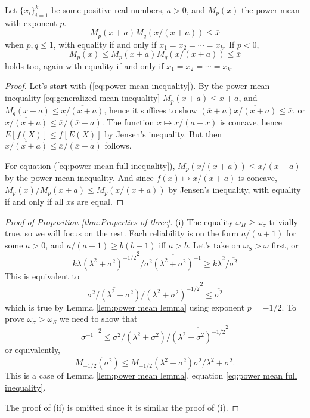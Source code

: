 \documentclass[twoside]{article}
\begin{document}
\begin{lem}
\label{lem:power mean lemma}Let $\{ x_{i}\} _{i=1}^{k}$
be some positive real numbers, $a>0$, and $M_{p}(x)$
the power mean with exponent $p$. 
\begin{equation}
M_{p}(x+a)M_{q}(x/{(x+a)})\leq\overline{x}\label{eq:power mean inequality}
\end{equation}
when $p,q\leq1$, with equality if and only if $x_{1}=x_{2}=\cdots=x_{k}$.
If $p<0$, 
\begin{equation}
M_{p}(x)\leq M_{p}(x+a)M_{q}(x/{(x+a)})\leq\overline{x}\label{eq:power mean full inequality}
\end{equation}
holds too, again with equality if and only if $x_{1}=x_{2}=\cdots=x_{k}$.
\end{lem}

\begin{proof}
Let's start with (\ref{eq:power mean inequality}). By the power
mean inequality \eqref{eq:generalized mean inequality}  $M_{p}(x+a)\leq\overline{x}+a$, and $M_{q}(x+a)\leq\overline{x/(x+a)}$,
hence it suffices to show $(\overline{x}+a)\overline{x/(x+a)}\leq\overline{x}$,
or $\overline{x/(x+a)}\leq\overline{x}/(\overline{x}+a)$.
The function $x\mapsto x/(a+x)$ is concave, hence $E[f(X)]\leq f[E(X)]$
by Jensen's inequality. But then $\overline{x/(x+a)}\leq\overline{x}/(\overline{x}+a)$
follows.

For equation (\ref{eq:power mean full inequality}), $M_{p}(x/({x+a}))\leq\overline{x}/(\overline{x}+a)$
by the power mean inequality. And since $f(x)\mapsto x/(x+a)$
is concave, $M_{p}(x)/M_{p}(x+a)\leq M_{p}(x/(x+a))$
by Jensen's inequality, with equality if and only if all $x$s are
equal.
\end{proof}

\begin{proof}[Proof of Proposition \ref{thm:Properties of three}]\label{proof:Properties}
(i) The equality $\omega_H \geq \omega_\sigma$ trivially true, so we will focus on the rest. Each reliability is on the form $a/(a+1)$ for some $a>0$, and $a/(a+1)\geq b(b+1)$
iff $a>b$. Let's take on $\omega_S > \omega$ first, or
\[
k\overline{\lambda(\lambda^{2}+\sigma^{2})^{-1/2}}^{2}/\overline{\sigma^{2}(\lambda^{2}+\sigma^{2})^{-1}}\geq k\overline{\lambda}^{2}/\overline{\sigma^{2}}
\]
This is equivalent to 
\[
\overline{\sigma^{2}/(\lambda^{2}+\sigma^{2})}/\overline{(\lambda^{2}+\sigma^{2})^{-1/2}}^{2}\leq\overline{\sigma^{2}}
\]
which is true by Lemma \ref{lem:power mean lemma} using exponent $p = -1/2$.
To prove $\omega_{\sigma}>\omega_{S}$ we need to show that
\[
\overline{\sigma^{-1}}^{-2}\leq\overline{\sigma^{2}/(\lambda^{2}+\sigma^{2})}/\overline{(\lambda^{2}+\sigma^{2})^{-1/2}}^{2}
\]
or equivalently,
\[
M_{-1/2}(\sigma^{2})\leq M_{-1/2}(\lambda^{2}+\sigma^{2})\overline{\sigma^{2}/\lambda^{2}+\sigma^{2}}.
\]
This is a case of Lemma \ref{lem:power mean lemma}, equation \eqref{eq:power mean full inequality}.

The proof of (ii) is omitted since it is similar the proof of (i).
\end{proof}
\end{document}
